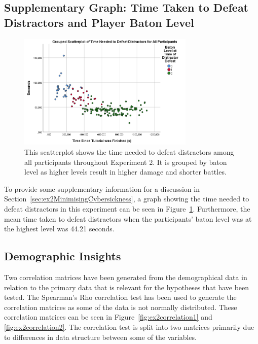 \subsection{Supplementary Graph: Time Taken to Defeat Distractors and Player Baton Level}\label{sec:ex2distractorDefeatTimes}
\begin{figure}[tbph]
    \centering
    \includegraphics[width=0.75\textwidth]{figures/graphs/TimeSpentOnDistractorDefeat.png}
    \caption[Scatterplot Over Time Needed to Defeat Distractors in Experiment 2]{This scatterplot shows the time needed to defeat distractors among all participants throughout Experiment 2. It is grouped by baton level as higher levels result in higher damage and shorter battles.}
    \label{fig:ex2TimeNeededToDefeatDistractorsScatter}
\end{figure}
To provide some supplementary information for a discussion in Section~\ref{sec:ex2MinimisingCybersickness}, a graph showing the time needed to defeat distractors in this experiment can be seen in Figure~\ref{fig:ex2TimeNeededToDefeatDistractorsScatter}. Furthermore, the mean time taken to defeat distractors when the participants' baton level was at the highest level was 44.21 seconds.

\subsection{Demographic Insights}
Two correlation matrices have been generated from the demographical data in relation to the primary data that is relevant for the hypotheses that have been tested. The Spearman's Rho correlation test has been used to generate the correlation matrices as some of the data is not normally distributed. These correlation matrices can be seen in Figure~\ref{fig:ex2correlation1} and \ref{fig:ex2correlation2}. The correlation test is split into two matrices primarily due to differences in data structure between some of the variables. 

